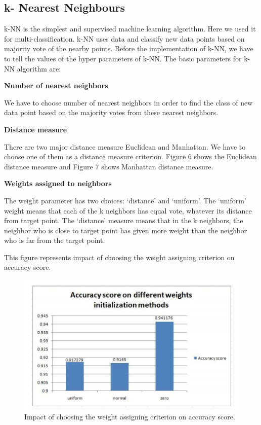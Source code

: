 \subsection{k- Nearest Neighbours}

k-NN is the simplest and supervised machine learning algorithm. Here we used it for multi-classification. k-NN uses data and classify new data points based on majority vote of the nearby points. Before the implementation of k-NN, we have to tell the values of the hyper parameters of k-NN. The basic parameters for k-NN algorithm are:

\textbf{Number of nearest neighbors}

We have to choose number of nearest neighbors in order to find the class of new data point based on the majority votes from these nearest neighbors.

\textbf{Distance measure}

There are two major distance measure Euclidean and Manhattan. We have to choose one of them as a distance measure criterion. Figure 6 shows the Euclidean distance measure and Figure 7 shows Manhattan distance measure.


\textbf{Weights assigned to neighbors}

The weight parameter has two choices: ‘distance’ and ‘uniform’. The ‘uniform’ weight means that each of the k neighbors has equal vote, whatever its distance from target point. The ‘distance’ measure means that in the k neighbors, the neighbor who is close to target point has given more weight than the neighbor who is far from the target point.

This figure represents impact of choosing the weight assigning criterion on accuracy score.
\begin{figure}[h]
  		\centering
    		\includegraphics[scale=0.85]{./Figures/weights}
\caption{Impact of choosing the weight assigning criterion on accuracy score.}
\label{fig:1}
 		\end{figure}


